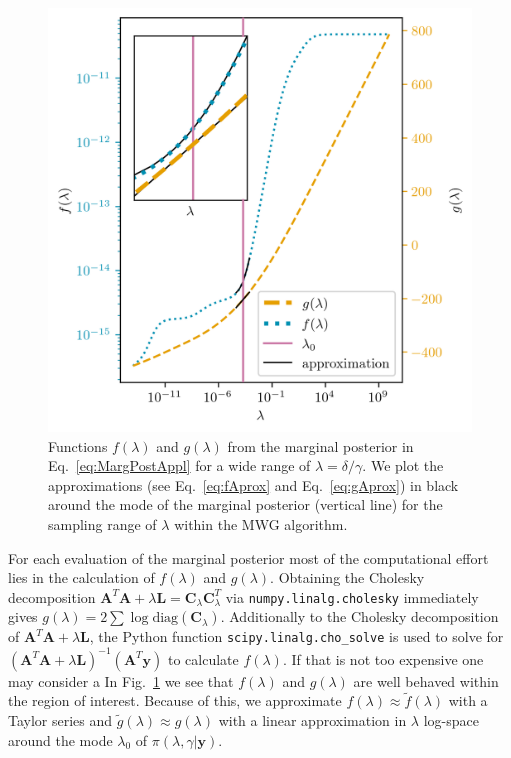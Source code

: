 \begin{figure}[th!]
	\centering
	\includegraphics{f_and_g_phd.png}
	\caption[Functions $f(\lambda)$ and $g(\lambda)$ of 2D marginal posterior.]{Functions $f(\lambda)$ and $g(\lambda)$ from the marginal posterior in Eq.~\ref{eq:MargPostAppl} for a wide range of $\lambda = \delta / \gamma$. We plot the approximations (see Eq.~\ref{eq:fAprox} and Eq.~\ref{eq:gAprox}) in black around the mode of the marginal posterior (vertical line) for the sampling range of $\lambda$ within the MWG algorithm.}
	\label{fig:fandg}
\end{figure}
For each evaluation of the marginal posterior most of the computational effort lies in the calculation of $f(\lambda)$ and $g(\lambda)$.
Obtaining the Cholesky decomposition $\bm{A}^T  \bm{A} + \lambda \bm{L} = \bm{C}_{\lambda} \bm{C}_{\lambda}^T$ via \texttt{numpy.linalg.cholesky} immediately gives $g(\lambda) = 2 \sum \log \text{diag}(\bm{C}_{\lambda}) $.
Additionally to the Cholesky decomposition of $\bm{A}^T  \bm{A} + \lambda \bm{L}$, the Python function \texttt{scipy.linalg.cho\_solve} is used to solve for $(\bm{A}^T  \bm{A} + \lambda \bm{L})^{-1} (\bm{A}^T \bm{y})$ to calculate $f(\lambda)$.
If that is not too expensive one may consider a 
In  Fig.~\ref{fig:fandg} we see that $f(\lambda)$ and $g(\lambda)$ are well behaved within the region of interest.
Because of this, we approximate $f(\lambda) \approx \tilde{f}(\lambda)$ with a Taylor series and $\tilde{g}(\lambda) \approx g(\lambda)$ with a linear approximation in $\lambda$ log-space around the mode $\lambda_0$ of $\pi(\lambda, \gamma | \bm{y})$.
